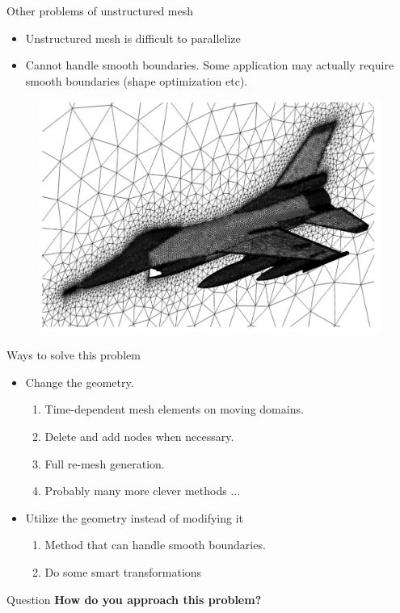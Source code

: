 \begin{frame}{}

    \begin{block}{ Other problems of unstructured mesh }
        \begin{itemize}
            \item Unstructured mesh is difficult to parallelize
            \item Cannot handle smooth boundaries. Some application may actually require smooth boundaries (shape optimization etc).
        \end{itemize}
    \end{block}
    \begin{figure}
        \centering
        \includegraphics[width=0.45 \textwidth]{figures/unstructured_mesh_f16.png}
    \end{figure}
\end{frame}

\begin{frame}{Ways to solve this problem}
    \begin{itemize}
        \item Change the geometry.
            \begin{enumerate}
                \item Time-dependent mesh elements on moving domains.
                \item Delete and add nodes when necessary.
                \item Full re-mesh generation.
                \item Probably many more clever methods $\ldots$
            \end{enumerate}
        \item Utilize the geometry instead of modifying it
            \begin{enumerate}
                \item Method that can handle smooth boundaries.
                \item Do some smart transformations
            \end{enumerate}
    \end{itemize}
    \begin{block}{Question}
        \textbf{How do you approach this problem?}
    \end{block}

\end{frame}

